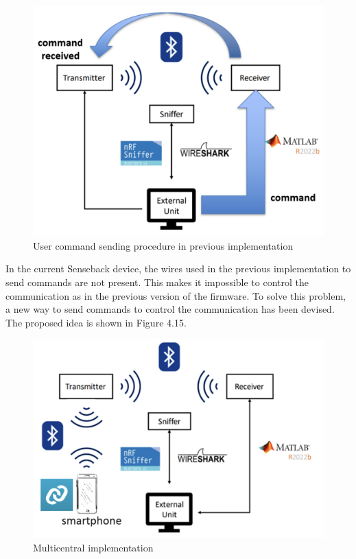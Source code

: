 \documentclass{Configuration_Files/PoliMi3i_thesis}
\begin{document}
\begin{figure}[H]
    \centering
    \includegraphics[scale=0.5]{Multicentral/1.png}
    \caption{User command sending procedure in previous implementation}
    \label{multicentral_1}
\end{figure}

In the current Senseback device, the wires used in the previous implementation to send commands are not present. This makes it impossible to control the communication as in the previous version of the firmware. To solve this problem, a new way to send commands to control the communication has been devised. The proposed idea is shown in Figure 4.15.


\begin{figure}[H]
    \centering
    \includegraphics[scale=0.5]{Multicentral/2.png}
    \caption{Multicentral implementation}
    \label{multicentral_2}
\end{figure}
\end{document}
